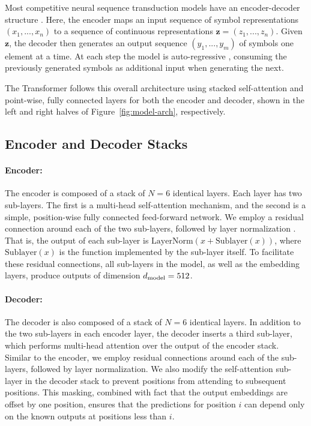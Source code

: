Most competitive neural sequence transduction models have an encoder-decoder
structure \citep{cho2014learning,bahdanau2014neural,sutskever14}. Here, the
encoder maps an input sequence of symbol representations $(x_1, ..., x_n)$ to a
sequence of continuous representations $\mathbf{z} = (z_1, ..., z_n)$. Given
$\mathbf{z}$, the decoder then generates an output sequence $(y_1,...,y_m)$ of
symbols one element at a time. At each step the model is auto-regressive
\citep{graves2013generating}, consuming the previously generated symbols as
additional input when generating the next.

The Transformer follows this overall architecture using stacked self-attention
and point-wise, fully connected layers for both the encoder and decoder, shown
in the left and right halves of Figure~\ref{fig:model-arch}, respectively.

\subsection{Encoder and Decoder Stacks}

\paragraph{Encoder:}The encoder is composed of a stack of $N=6$ identical
layers. Each layer has two sub-layers. The first is a multi-head self-attention
mechanism, and the second is a simple, position-wise fully connected
feed-forward network.	We employ a residual connection \citep{he2016deep}
around each of the two sub-layers, followed by layer normalization
\cite{layernorm2016}.  That is, the output of each sub-layer is
$\mathrm{LayerNorm}(x + \mathrm{Sublayer}(x))$, where $\mathrm{Sublayer}(x)$ is
the function implemented by the sub-layer itself.  To facilitate these residual
connections, all sub-layers in the model, as well as the embedding layers,
produce outputs of dimension $d_{\text{model}}=512$.

\paragraph{Decoder:}The decoder is also composed of a stack of $N=6$ identical
layers.  In addition to the two sub-layers in each encoder layer, the decoder
inserts a third sub-layer, which performs multi-head attention over the output
of the encoder stack.  Similar to the encoder, we employ residual connections
around each of the sub-layers, followed by layer normalization.  We also modify
the self-attention sub-layer in the decoder stack to prevent positions from
attending to subsequent positions.  This masking, combined with fact that the
output embeddings are offset by one position, ensures that the predictions for
position $i$ can depend only on the known outputs at positions less than $i$.

